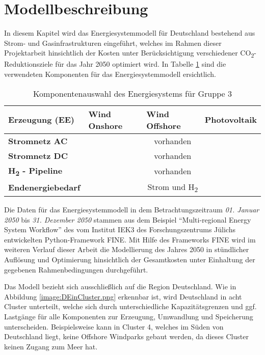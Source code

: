\section{Modellbeschreibung}
\label{chap:modellbeschreibung}
In diesem Kapitel wird das Energiesystemmodell für Deutschland bestehend aus Strom- und Gasinfrastrukturen eingeführt, welches im Rahmen dieser Projektarbeit hinsichtlich der Kosten unter Berücksichtigung verschiedener CO\textsubscript{2}-Reduktionsziele für das Jahr 2050 optimiert wird. In Tabelle \ref{tab:systemdesign2} sind die verwendeten Komponenten für das Energiesystemmodell ersichtlich.

\begin{table}[ht!]
    \centering
    \begin{tabular}{|lcll|}
        \hline
        \multicolumn{1}{|l|}{\textbf{Erzeugung (EE)}} & \multicolumn{1}{l|}{Wind Onshore} & \multicolumn{1}{l|}{Wind Offshore} & Photovoltaik \\ \hline
        \multicolumn{1}{|l|}{\textbf{Stromnetz AC}}     & \multicolumn{3}{c|}{vorhanden}                \\ \hline
        \multicolumn{1}{|l|}{\textbf{Stromnetz DC}}     & \multicolumn{3}{c|}{vorhanden}                \\ \hline
        \multicolumn{1}{|l|}{\textbf{H\textsubscript{2} - Pipeline}}    & \multicolumn{3}{c|}{vorhanden}                \\ \hline
        \multicolumn{1}{|l|}{\textbf{Endenergiebedarf}} & \multicolumn{3}{c|}{Strom und H\textsubscript{2}} \\ \hline
    \end{tabular}
    \caption{Komponentenauswahl des Energiesystems für Gruppe 3}
    \label{tab:systemdesign2}
\end{table}


Die Daten für das Energiesystemmodell in dem Betrachtungszeitraum \textit{01. Januar 2050} bis \textit{31. Dezember 2050} stammen aus dem Beispiel ``Multi-regional Energy System Workflow'' des vom Institut IEK3 des Forschungszentrums Jülichs entwickelten Python-Framework FINE. \cite{WELDER20181130}
Mit Hilfe des Frameworks FINE wird im weiteren Verlauf dieser Arbeit die Modellierung des Jahres 2050 in stündlicher Auflösung und Optimierung hinsichtlich der Gesamtkosten unter Einhaltung der gegebenen Rahmenbedingungen durchgeführt.


Das Modell bezieht sich ausschließlich auf die Region Deutschland. Wie in Abbildung \ref{image:DEinCluster.png} erkennbar ist, wird Deutschland in acht Cluster unterteilt, welche sich durch unterschiedliche Kapazitätsgrenzen und ggf. Lastgänge für alle Komponenten zur Erzeugung, Umwandlung und Speicherung  unterscheiden. Beispielsweise kann in Cluster 4, welches im Süden von Deutschland liegt, keine Offshore Windparks gebaut werden, da dieses Cluster keinen Zugang zum Meer hat. 

